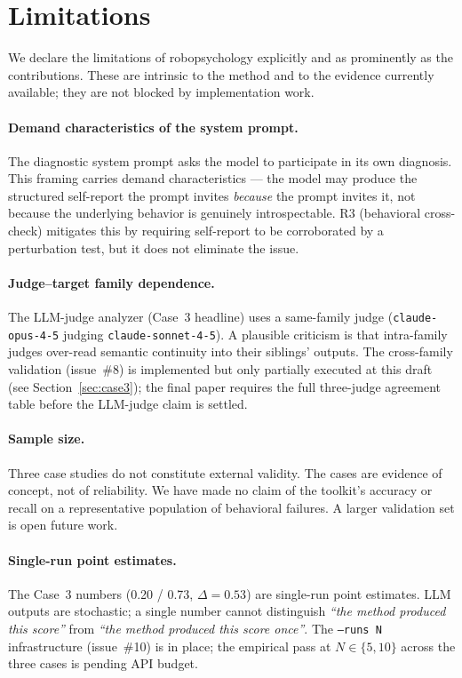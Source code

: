 \section{Limitations}
\label{sec:limitations}

We declare the limitations of robopsychology explicitly and as
prominently as the contributions. These are intrinsic to the method
and to the evidence currently available; they are not blocked by
implementation work.

\paragraph{Demand characteristics of the system prompt.}
The diagnostic system prompt asks the model to participate in its own
diagnosis. This framing carries demand characteristics --- the model
may produce the structured self-report the prompt invites \emph{because}
the prompt invites it, not because the underlying behavior is genuinely
introspectable. R3 (behavioral cross-check) mitigates this by requiring
self-report to be corroborated by a perturbation test, but it does not
eliminate the issue.

\paragraph{Judge--target family dependence.}
The LLM-judge analyzer (Case~3 headline) uses a same-family judge
(\texttt{claude-opus-4-5} judging \texttt{claude-sonnet-4-5}). A
plausible criticism is that intra-family judges over-read semantic
continuity into their siblings' outputs. The cross-family validation
(issue~\#8) is implemented but only partially executed at this draft
(see Section~\ref{sec:case3}); the final paper requires the full
three-judge agreement table before the LLM-judge claim is settled.

\paragraph{Sample size.}
Three case studies do not constitute external validity. The cases are
evidence of concept, not of reliability. We have made no claim of the
toolkit's accuracy or recall on a representative population of
behavioral failures. A larger validation set is open future work.

\paragraph{Single-run point estimates.}
The Case~3 numbers (0.20 / 0.73, $\Delta = 0.53$) are single-run point
estimates. LLM outputs are stochastic; a single number cannot
distinguish \emph{``the method produced this score''} from
\emph{``the method produced this score once''}. The
\texttt{--runs N} infrastructure (issue~\#10) is in place; the
empirical pass at $N \in \{5, 10\}$ across the three cases is pending
API budget.

